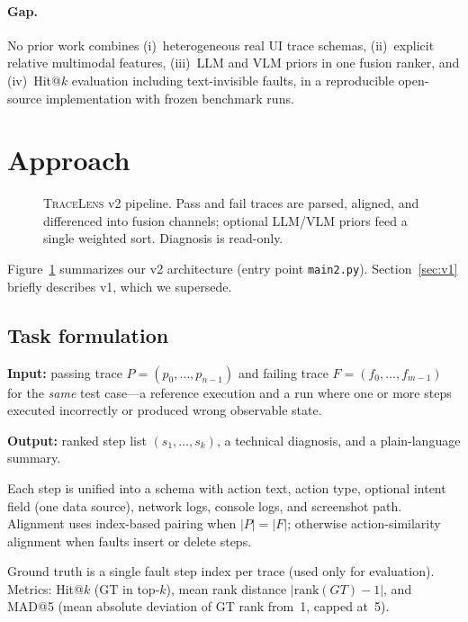 \documentclass[sigconf,nonacm]{acmart}
\begin{document}
\paragraph{Gap.}
No prior work combines (i)~heterogeneous real UI trace schemas, (ii)~explicit relative multimodal features, (iii)~LLM and VLM priors in one fusion ranker, and (iv)~Hit@$k$ evaluation including text-invisible faults, in a reproducible open-source implementation with frozen benchmark runs.

\section{Approach}
\label{sec:approach}

\begin{figure}[t]
  \centering
  \resizebox{\linewidth}{!}{%
  }
  \caption{\textsc{TraceLens} v2 pipeline. Pass and fail traces are parsed, aligned, and differenced into fusion channels; optional LLM/VLM priors feed a single weighted sort. Diagnosis is read-only.}
  \label{fig:arch-v2}
\end{figure}

Figure~\ref{fig:arch-v2} summarizes our v2 architecture (entry point \texttt{main2.py}).
Section~\ref{sec:v1} briefly describes v1, which we supersede.

\subsection{Task formulation}
\label{sec:task}

\textbf{Input:} passing trace $P = (p_0,\ldots,p_{n-1})$ and failing trace $F = (f_0,\ldots,f_{m-1})$ for the \emph{same} test case---a reference execution and a run where one or more steps executed incorrectly or produced wrong observable state.

\textbf{Output:} ranked step list $(s_1,\ldots,s_k)$, a technical diagnosis, and a plain-language summary.

Each step is unified into a schema with action text, action type, optional intent field (one data source), network logs, console logs, and screenshot path.
Alignment uses index-based pairing when $|P|=|F|$; otherwise action-similarity alignment when faults insert or delete steps.

Ground truth is a single fault step index per trace (used only for evaluation).
Metrics: Hit@$k$ (GT in top-$k$), mean rank distance $|\mathrm{rank}(GT) - 1|$, and MAD@5 (mean absolute deviation of GT rank from~1, capped at~5).
\end{document}
